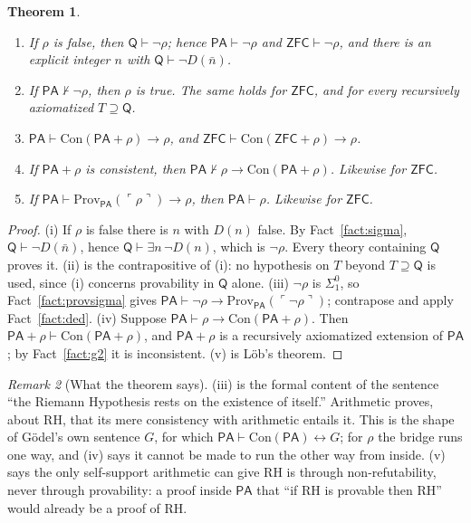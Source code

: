 \documentclass[11pt]{article}
\newtheorem{theorem}{Theorem}[section]
\theoremstyle{definition}
\theoremstyle{remark}
\newtheorem{remark}[theorem]{Remark}
\newcommand{\PA}{\mathsf{PA}}
\newcommand{\ZFC}{\mathsf{ZFC}}
\newcommand{\RA}{\mathsf{Q}}
\newcommand{\Prov}{\mathrm{Prov}}
\newcommand{\Con}{\mathrm{Con}}
\newcommand{\RH}{\mathrm{RH}}
\newcommand{\gn}[1]{\ulcorner #1\urcorner}
\newcommand{\Sigone}{\Sigma^0_1}
\begin{document}
\begin{theorem}\label{thm:self}
\begin{enumerate}
\item[(i)] If $\rho$ is false, then $\RA\vdash\neg\rho$; hence $\PA\vdash\neg\rho$ and $\ZFC\vdash\neg\rho$, and there is an explicit integer $n$ with $\RA\vdash\neg D(\bar n)$.
\item[(ii)] If $\PA\nvdash\neg\rho$, then $\rho$ is true. The same holds for $\ZFC$, and for every recursively axiomatized $T\supseteq\RA$.
\item[(iii)] $\PA\vdash\Con(\PA+\rho)\to\rho$, and $\ZFC\vdash\Con(\ZFC+\rho)\to\rho$.
\item[(iv)] If $\PA+\rho$ is consistent, then $\PA\nvdash\rho\to\Con(\PA+\rho)$. Likewise for $\ZFC$.
\item[(v)] If $\PA\vdash\Prov_\PA(\gn\rho)\to\rho$, then $\PA\vdash\rho$. Likewise for $\ZFC$.
\end{enumerate}
\end{theorem}

\begin{proof}
(i) If $\rho$ is false there is $n$ with $D(n)$ false. By Fact~\ref{fact:sigma}, $\RA\vdash\neg D(\bar n)$, hence $\RA\vdash\exists n\,\neg D(n)$, which is $\neg\rho$. Every theory containing $\RA$ proves it. (ii) is the contrapositive of (i): no hypothesis on $T$ beyond $T\supseteq\RA$ is used, since (i) concerns provability in $\RA$ alone. (iii) $\neg\rho$ is $\Sigone$, so Fact~\ref{fact:provsigma} gives $\PA\vdash\neg\rho\to\Prov_\PA(\gn{\neg\rho})$; contrapose and apply Fact~\ref{fact:ded}. (iv) Suppose $\PA\vdash\rho\to\Con(\PA+\rho)$. Then $\PA+\rho\vdash\Con(\PA+\rho)$, and $\PA+\rho$ is a recursively axiomatized extension of $\PA$; by Fact~\ref{fact:g2} it is inconsistent. (v) is L\"ob's theorem.
\end{proof}

\begin{remark}[What the theorem says]
(iii) is the formal content of the sentence ``the Riemann Hypothesis rests on the existence of itself.'' Arithmetic proves, about $\RH$, that its mere consistency with arithmetic entails it. This is the shape of G\"odel's own sentence $G$, for which $\PA\vdash\Con(\PA)\leftrightarrow G$; for $\rho$ the bridge runs one way, and (iv) says it cannot be made to run the other way from inside. (v) says the only self-support arithmetic can give $\RH$ is through non-refutability, never through provability: a proof inside $\PA$ that ``if $\RH$ is provable then $\RH$'' would already be a proof of $\RH$.
\end{remark}
\end{document}
